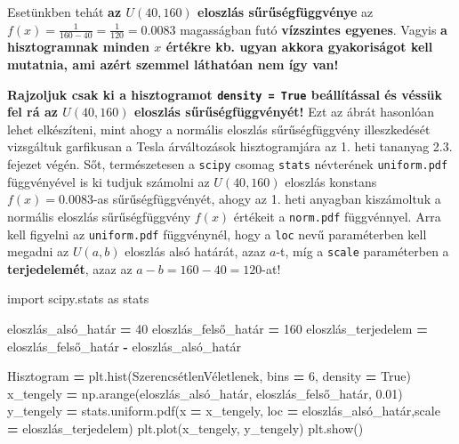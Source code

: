 \documentclass[
]{book}
\newenvironment{Shaded}{\begin{snugshade}}{\end{snugshade}}
\newcommand{\DecValTok}[1]{\textcolor[rgb]{0.00,0.00,0.81}{#1}}
\newcommand{\FloatTok}[1]{\textcolor[rgb]{0.00,0.00,0.81}{#1}}
\newcommand{\ImportTok}[1]{#1}
\newcommand{\NormalTok}[1]{#1}
\newcommand{\OperatorTok}[1]{\textcolor[rgb]{0.81,0.36,0.00}{\textbf{#1}}}
\newcommand{\VariableTok}[1]{\textcolor[rgb]{0.00,0.00,0.00}{#1}}
\begin{document}
Esetünkben tehát \textbf{az \(U(40,160)\) eloszlás sűrűségfüggvénye} az \(f(x)=\frac{1}{160-40}=\frac{1}{120}=0.0083\) magasságban futó \textbf{vízszintes egyenes}. Vagyis \textbf{a hisztogramnak minden \(x\) értékre kb. ugyan akkora gyakoriságot kell mutatnia, ami azért szemmel láthatóan nem így van!}

\textbf{Rajzoljuk csak ki a hisztogramot \texttt{density\ =\ True} beállítással és véssük fel rá az \(U(40,160)\) eloszlás sűrűségfüggvényét!} Ezt az ábrát hasonlóan lehet elkészíteni, mint ahogy a normális eloszlás sűrűségfüggvény illeszkedését vizsgáltuk garfikusan a Tesla árváltozások hisztogramjára az 1. heti tananyag 2.3. fejezet végén.
Sőt, természetesen a \texttt{scipy} csomag \texttt{stats} névterének \texttt{uniform.pdf} függvényével is ki tudjuk számolni az \(U(40,160)\) eloszlás konstans \(f(x)=0.0083\)-as sűrűségfüggvényét, ahogy az 1. heti anyagban kiszámoltuk a normális eloszlás sűrűségfüggvény \(f(x)\) értékeit a \texttt{norm.pdf} függvénnyel. Arra kell figyelni az \texttt{uniform.pdf} függvénynél, hogy a \texttt{loc} nevű paraméterben kell megadni az \(U(a,b)\) eloszlás alsó határát, azaz \(a\)-t, míg a \texttt{scale} paraméterben a \textbf{terjedelemét}, azaz az \(a-b=160-40=120\)-at!

\begin{Shaded}
\begin{Highlighting}[]
\ImportTok{import}\NormalTok{ scipy.stats }\ImportTok{as}\NormalTok{ stats}

\NormalTok{eloszlás\_alsó\_határ }\OperatorTok{=} \DecValTok{40}
\NormalTok{eloszlás\_felső\_határ }\OperatorTok{=} \DecValTok{160}
\NormalTok{eloszlás\_terjedelem }\OperatorTok{=}\NormalTok{ eloszlás\_felső\_határ }\OperatorTok{{-}}\NormalTok{ eloszlás\_alsó\_határ}

\NormalTok{Hisztogram }\OperatorTok{=}\NormalTok{ plt.hist(SzerencsétlenVéletlenek, bins }\OperatorTok{=} \DecValTok{6}\NormalTok{, density }\OperatorTok{=} \VariableTok{True}\NormalTok{)}
\NormalTok{x\_tengely }\OperatorTok{=}\NormalTok{ np.arange(eloszlás\_alsó\_határ, eloszlás\_felső\_határ, }\FloatTok{0.01}\NormalTok{)}
\NormalTok{y\_tengely }\OperatorTok{=}\NormalTok{ stats.uniform.pdf(x }\OperatorTok{=}\NormalTok{ x\_tengely, loc }\OperatorTok{=}\NormalTok{ eloszlás\_alsó\_határ,scale }\OperatorTok{=}\NormalTok{ eloszlás\_terjedelem)}
\NormalTok{plt.plot(x\_tengely, y\_tengely)}
\NormalTok{plt.show()}
\end{Highlighting}
\end{Shaded}
\end{document}
